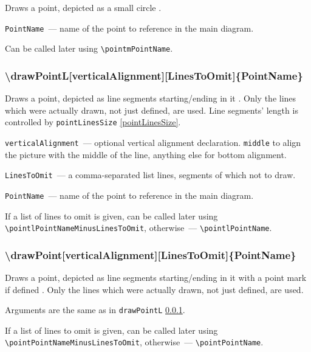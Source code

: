 	Draws a point, depicted as a small circle .
	
	\texttt{PointName}~— name of the point to reference in the main diagram. 
	
	Can be called later using \texttt{\textbackslash pointmPointName}. 

\subsubsection{\textbackslash drawPointL[verticalAlignment][LinesToOmit]\{PointName\}}\label{drawPointL}

	Draws a point, depicted as line segments starting/ending in it . Only the lines which were actually drawn, not just defined, are used. Line segments' length is controlled by \texttt{pointLinesSize} \ref{pointLinesSize}.

	\texttt{verticalAlignment}~— optional vertical alignment declaration. \texttt{middle} to align the picture with the middle of the line, anything else for bottom alignment.
	
	\texttt{LinesToOmit}~— a comma-separated list lines, segments of which not to draw. 
	
	\texttt{PointName}~— name of the point to reference in the main diagram. 
	
	If a list of lines to omit is given, can be called later using \texttt{\textbackslash pointl\-Point\-Name\-Minus\-Lines\-To\-Omit}, otherwise~— \texttt{\textbackslash pointlPointName}. 

\subsubsection{\textbackslash drawPoint[verticalAlignment][LinesToOmit]\{PointName\}}

	Draws a point, depicted as line segments starting/ending in it with a point mark if defined . Only the lines which were actually drawn, not just defined, are used.

	Arguments are the same as in \texttt{drawPointL} \ref{drawPointL}.
	
	If a list of lines to omit is given, can be called later using \texttt{\textbackslash point\-Point\-Name\-Minus\-Lines\-To\-Omit}, otherwise~— \texttt{\textbackslash pointPointName}. 





